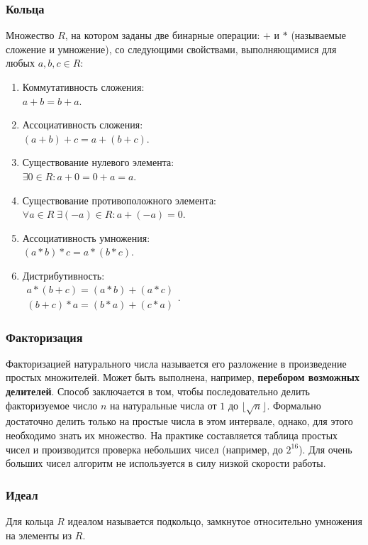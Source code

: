 \documentclass[12pt]{matmex-diploma}
\begin{document}
        \subsubsection*{Кольца}
            Множество $R$, на котором заданы две бинарные операции: $+$ и $*$ (называемые сложение и умножение), со следующими свойствами, выполняющимися для любых $a, b, c \in R$:
            \begin{enumerate}
                \item Коммутативность сложения: \\$a+b=b+a$.
                \item Ассоциативность сложения: \\$(a+b)+c=a+(b+c)$.
                \item Существование нулевого элемента: \\$\exists{0}\in R\colon a+{0}={0}+a=a$.
                \item Существование противоположного элемента: \\$\forall a\in R\;\exists (-a)\in R\colon a+(-a)={0}$.
                \item Ассоциативность умножения: \\$(a*b)*c=a*(b*c)$.
                \item Дистрибутивность: \\$\begin{matrix}a* (b+c)=(a*b)+(a*c)\\(b+c)*a=(b*a)+(c*a)\end{matrix}$.
            \end{enumerate}             
            
        \subsubsection*{Факторизация}
            Факторизацией натурального числа называется его разложение в произведение простых множителей. Может быть выполнена, например, \textbf{перебором возможных делителей}. Способ заключается в том, чтобы последовательно делить факторизуемое число $n$ на натуральные числа от $1$ до $\lfloor {\sqrt {n}}\rfloor$. Формально достаточно делить только на простые числа в этом интервале, однако, для этого необходимо знать их множество. На практике составляется таблица простых чисел и производится проверка небольших чисел (например, до $2^{16}$). Для очень больших чисел алгоритм не используется в силу низкой скорости работы.
            
        \subsubsection*{Идеал}
            Для кольца $R$ идеалом называется подкольцо, замкнутое относительно умножения на элементы из $R$.
        
\end{document}

